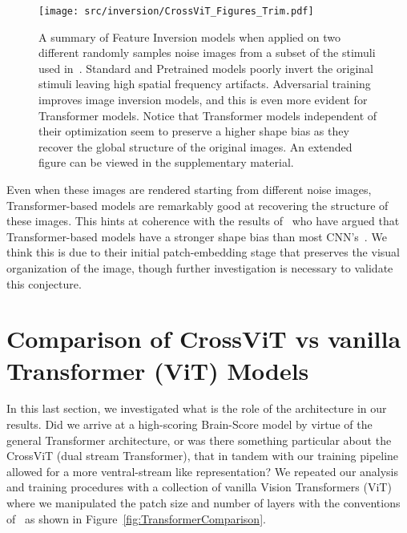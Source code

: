 \documentclass{article} %
\begin{document}
\begin{figure}[!t]\centering
\texttt{[image: src/inversion/CrossViT\_Figures\_Trim.pdf]}
\caption{A summary of Feature Inversion models when applied on two different randomly samples noise images from a subset of the stimuli used in~\cite{harrington2022finding}. Standard and Pretrained models poorly invert the original stimuli leaving high spatial frequency artifacts. Adversarial training improves image inversion models, and this is even more evident for Transformer models. Notice that Transformer models independent of their optimization seem to preserve a higher shape bias as they recover the global structure of the original images. An extended figure can be viewed in the supplementary material.}
\label{fig:FeatureInversion}
\end{figure}

Even when these images are rendered starting from different noise images, Transformer-based models are remarkably good at recovering the structure of these images. This hints at coherence with the results of~\cite{tuli2021convolutional} who have argued that Transformer-based models have a stronger shape bias than most CNN's~\citep{geirhos2018imagenettrained}. We think this is due to their initial patch-embedding stage that preserves the visual organization of the image, though further investigation is necessary to validate this conjecture.

\section{Comparison of CrossViT vs vanilla Transformer (ViT) Models}

In this last section, we investigated what is the role of the architecture in our results. Did we arrive at a high-scoring Brain-Score model by virtue of the general Transformer architecture, or was there something particular about the CrossViT (dual stream Transformer), that in tandem with our training pipeline allowed for a more ventral-stream like representation? We repeated our analysis and training procedures with a collection of  vanilla Vision Transformers (ViT) where we manipulated the patch size and number of layers with the conventions of~\cite{dosovitskiy2021an} as shown in Figure~\ref{fig:TransformerComparison}.
\end{document}

